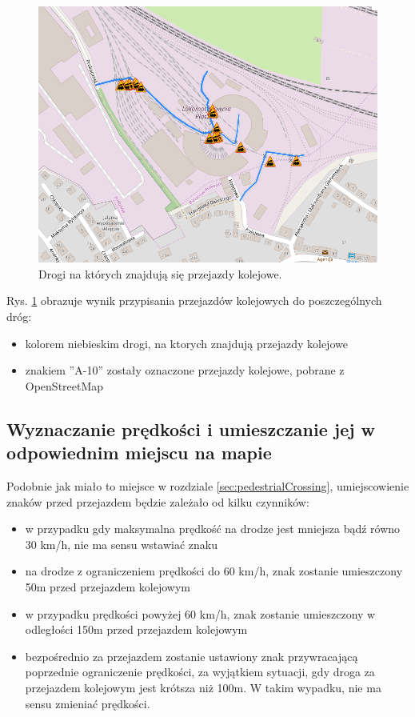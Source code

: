 \begin{figure}[h]
\caption{Drogi na których znajdują się przejazdy kolejowe.}
\label{sec:PrzejazdyKolejowe}
\centering
\includegraphics[width=1.0\textwidth]{railCrossing}
\end{figure}

Rys. \ref{sec:PrzejazdyKolejowe} obrazuje wynik przypisania przejazdów kolejowych do poszczególnych dróg:
\begin{itemize}
\item kolorem niebieskim drogi, na ktorych znajdują przejazdy kolejowe
\item znakiem ''A-10'' zostały oznaczone przejazdy kolejowe, pobrane z OpenStreetMap
\end{itemize}

\newpage
\subsection{Wyznaczanie prędkości i umieszczanie jej w odpowiednim miejscu na mapie}

Podobnie jak miało to miejsce w rozdziale \ref{sec:pedestrialCrossing}, umiejscowienie znaków przed przejazdem będzie zależało od kilku czynników:
\begin{itemize}
\item w przypadku gdy maksymalna prędkość na drodze jest mniejsza bądź równo 30 km/h, nie ma sensu wstawiać znaku
\item na  drodze z ograniczeniem prędkości do 60 km/h, znak zostanie umieszczony 50m przed przejazdem kolejowym
\item w przypadku prędkości powyżej 60 km/h, znak zostanie umieszczony w odległości 150m przed przejazdem kolejowym
\item bezpośrednio za przejazdem zostanie ustawiony znak przywracającą poprzednie ograniczenie prędkości, za wyjątkiem sytuacji, gdy droga za przejazdem kolejowym jest krótsza niż 100m. W takim wypadku, nie ma sensu zmieniać prędkości.
\end{itemize}

